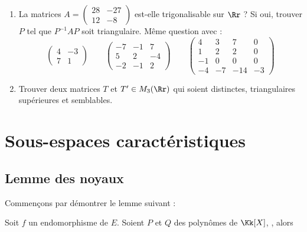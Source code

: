 \documentclass[12pt, class=report,crop=false]{standalone}
\begin{document}
 
\begin{miniexercices}
\sauteligne
\begin{enumerate}
  \item La matrices 
  $A = \left(\begin{smallmatrix}
  28 & -27 \\ 12 & -8
  \end{smallmatrix}\right)$ 
  est-elle trigonalisable sur $\Rr$ ? Si oui, trouver $P$ tel que 
  $P^{-1}AP$ soit triangulaire. 
  Même question avec :
$$\left(\begin{smallmatrix}
4 & -3 \\ 7 & 1
\end{smallmatrix}\right) \qquad
\left(\begin{smallmatrix}
-7 & -1 & 7 \\ 5 & 2 & -4 \\ -2 & -1 & 2
\end{smallmatrix}\right) \qquad
\left(\begin{smallmatrix}
4 & 3 & 7 & 0 \\
1 & 2 & 2 & 0 \\
-1 & 0 & 0 & 0 \\
-4 & -7 & -14 & -3
\end{smallmatrix}\right)$$  
   
  \item Trouver deux matrices $T$ et $T' \in M_3(\Rr)$  qui soient distinctes, triangulaires supérieures et semblables.
  
\end{enumerate}
\end{miniexercices}




\section{Sous-espaces caractéristiques}


\subsection{Lemme des noyaux}

Commençons par démontrer le lemme suivant :

\begin{lemme}
Soit $f$ un endomorphisme de $E$.
Soient $P$ et $Q$ des polynômes de $\Kk[X]$, , alors
\end{lemme}
 
\end{document}
